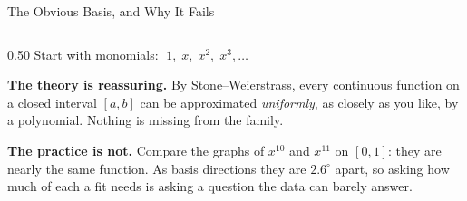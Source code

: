 \begin{frame}{The Obvious Basis, and Why It Fails}
\begin{columns}[T]
\begin{column}{0.50\textwidth}
\small
Start with monomials: $\;1,\;x,\;x^{2},\;x^{3},\dots$
\medskip

\textbf{The theory is reassuring.} By Stone--Weierstrass, every continuous function on a closed interval $[a,b]$ can be approximated \emph{uniformly}, as closely as you like, by a polynomial. Nothing is missing from the family.
\medskip

\textbf{The practice is not.} Compare the graphs of $x^{10}$ and $x^{11}$ on $[0,1]$: they are nearly the same function. As basis directions they are $\mathbf{2.6^{\circ}}$ apart, so asking how much of each a fit needs is asking a question the data can barely answer.
\medskip


\end{column}
\end{columns}
\end{frame}
